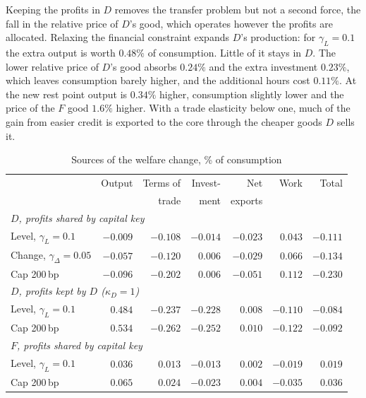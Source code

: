 Keeping the profits in $D$ removes the transfer problem but not a second force, the fall in the
relative price of $D$'s good, which operates however the profits are allocated.
Relaxing the financial constraint expands $D$'s production: for $\gamma_L=0.1$ the extra output is
worth $0.48\%$ of consumption. Little of it stays in $D$. The lower relative price of $D$'s good
absorbs $0.24\%$ and the extra investment $0.23\%$, which leaves consumption barely higher, and the
additional hours cost $0.11\%$. At the new rest point output is $0.34\%$ higher, consumption slightly
lower and the price of the $F$ good $1.6\%$ higher. With a trade elasticity below one, much of the
gain from easier credit is exported to the core through the cheaper goods $D$ sells it.

\begin{table}[tbp]
  \centering
  \begin{threeparttable}
  \caption{Sources of the welfare change, \% of consumption}
  \label{tab:welfare-channels}
  \footnotesize
  \begin{tabular}{l rrrrr r}
    \toprule
    & Output & Terms of & Invest- & Net & Work & Total \\
    & & trade & ment & exports & & \\
    \midrule
    \multicolumn{7}{l}{\emph{$D$, profits shared by capital key}} \\
    Level, $\gamma_L=0.1$          & $-0.009$ & $-0.108$ & $-0.014$ & $-0.023$ & $0.043$ & $-0.111$ \\
    Change, $\gamma_\Delta=0.05$  & $-0.057$ & $-0.120$ & $0.006$ & $-0.029$ & $0.066$ & $-0.134$ \\
    Cap 200\,bp                    & $-0.096$ & $-0.202$ & $0.006$ & $-0.051$ & $0.112$ & $-0.230$ \\
    \multicolumn{7}{l}{\emph{$D$, profits kept by $D$ ($\kappa_D=1$)}} \\
    Level, $\gamma_L=0.1$          & $0.484$ & $-0.237$ & $-0.228$ & $0.008$ & $-0.110$ & $-0.084$ \\
    Cap 200\,bp                    & $0.534$ & $-0.262$ & $-0.252$ & $0.010$ & $-0.122$ & $-0.092$ \\
    \multicolumn{7}{l}{\emph{$F$, profits shared by capital key}} \\
    Level, $\gamma_L=0.1$          & $0.036$ & $0.013$ & $-0.013$ & $0.002$ & $-0.019$ & $0.019$ \\
    Cap 200\,bp                    & $0.065$ & $0.024$ & $-0.023$ & $0.004$ & $-0.035$ & $0.036$ \\

\end{tabular}
\end{threeparttable}
\end{table}
